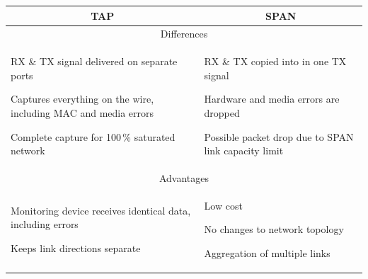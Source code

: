 \begin{table}[t!]
	\centering
	\begin{tabularx}{\textwidth}{XX}
	\toprule
		\multicolumn{1}{c}{\textbf{TAP}}  & \multicolumn{1}{c}{\textbf{SPAN}} \\ \midrule[1pt]
		
		\multicolumn{2}{c}{Differences} \\ \midrule
		\begin{compactitem}
			\item RX \& TX signal delivered on separate ports
			\item Captures everything on the wire, including MAC and media errors
			\item Complete capture for 100\,\% saturated network
		\end{compactitem}
		&
		\begin{compactitem}
			\item RX \& TX copied into in one TX signal
			\item Hardware and media errors are dropped
			\item Possible packet drop due to SPAN link capacity limit
		\end{compactitem}
		\\ \midrule
		
		\multicolumn{2}{c}{Advantages} \\ \midrule
		\begin{compactitem}
			\item Monitoring device receives identical data, including errors
			\item Keeps link directions separate
		\end{compactitem}
		& 
		\begin{compactitem}
			\item Low cost 
			\item No changes to network topology
			\item Aggregation of multiple links
		\end{compactitem}
		\\ \midrule
		

\end{tabularx}
\end{table}
